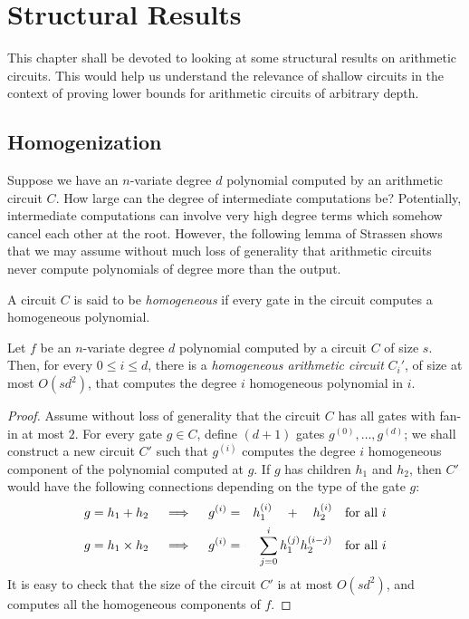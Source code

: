 \chapter{Structural Results}\label{chap:structural-results}


This chapter shall be devoted to looking at some structural results on arithmetic circuits. This would help us understand the relevance of shallow circuits in the context of proving lower bounds for arithmetic circuits of arbitrary depth. 

\section{Homogenization}\label{sec:homogenization}

Suppose we have an $n$-variate degree $d$ polynomial computed by an arithmetic circuit $C$. How large can the degree of intermediate computations be? Potentially, intermediate computations can involve very high degree terms which somehow cancel each other at the root. However, the following lemma of Strassen shows that we may assume without much loss of generality that arithmetic circuits never compute polynomials of degree more than the output. 

\begin{definition}
A circuit $C$ is said to be \emph{homogeneous} if every gate in the circuit computes a homogeneous polynomial. 
\end{definition}

\begin{lemma}[Homogenization]\label{lem:homogenization}
Let $f$ be an $n$-variate degree $d$ polynomial computed by a circuit $C$ of size $s$. Then, for every $0\leq i \leq d$, there is a \emph{homogeneous arithmetic circuit} $C_i'$, of size at most $O(sd^2)$, that computes the degree $i$ homogeneous polynomial in $i$. 
\end{lemma}
\begin{proof}
Assume without loss of generality that the circuit $C$ has all gates with fan-in at most $2$. 
For every gate $g\in C$, define $(d+1)$ gates $g^{(0)},\dots, g^{(d)}$; we shall construct a new circuit $C'$ such that $g^{(i)}$ computes the degree $i$ homogeneous component of the polynomial computed at $g$. If $g$ has children $h_1$ and $h_2$, then $C'$ would have the following connections depending on the type of the gate $g$:
\begin{eqnarray*}
\text{$g = h_1 + h_2$}\quad\implies\quad g^{(i)} &=& h_1^{(i)} \quad + \quad h_2^{(i)}\quad\text{for all $i$}\\
\text{$g = h_1 \times h_2$}\quad\implies\quad g^{(i)} &=& \sum_{j=0}^i h_1^{(j)} h_2^{(i-j)}\quad\text{for all $i$}
\end{eqnarray*}
It is easy to check that the size of the circuit $C'$ is at most $O(sd^2)$, and computes all the homogeneous components of $f$. 
\end{proof}


